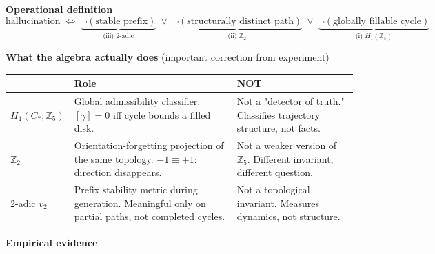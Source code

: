 \documentclass[11pt,a4paper]{article}
\begin{document}
\noindent\textbf{Operational definition}
\[
\boxed{
\mathrm{hallucination}
\;\Longleftrightarrow\;
\underbrace{\neg(\text{stable prefix})}_{\text{(iii) 2-adic}}\;
\vee\;
\underbrace{\neg(\text{structurally distinct path})}_{\text{(ii) }\mathbb{Z}_2}\;
\vee\;
\underbrace{\neg(\text{globally fillable cycle})}_{\text{(i) }H_1(\mathbb{Z}_5)}
}
\]

\vspace{8pt}

\noindent\textbf{What the algebra actually does}
(important correction from experiment)

\vspace{4pt}
\begin{tabular}{p{2.8cm}p{5.0cm}p{5.0cm}}
\toprule
& \textbf{Role} & \textbf{NOT} \\
\midrule
$H_1(C_*;\mathbb{Z}_5)$ &
  Global admissibility classifier.
  $[\gamma]=0$ iff cycle bounds a filled disk. &
  Not a "detector of truth."
  Classifies trajectory structure, not facts. \\[4pt]
$\mathbb{Z}_2$ &
  Orientation-forgetting projection of the same topology.
  $-1\equiv+1$: direction disappears. &
  Not a weaker version of $\mathbb{Z}_5$.
  Different invariant, different question. \\[4pt]
2-adic $v_2$ &
  Prefix stability metric during generation.
  Meaningful only on partial paths, not completed cycles. &
  Not a topological invariant.
  Measures dynamics, not structure. \\
\bottomrule
\end{tabular}

\vspace{10pt}

\noindent\textbf{Empirical evidence}
\end{document}
